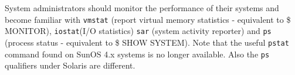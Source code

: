 System administrators should monitor the performance of their systems and
become familiar with {\tt vmstat} (report virtual memory statistics - 
equivalent to \$ MONITOR),  {\tt iostat}(I/O statistics)
{\tt sar} (system activity reporter) and {\tt ps}
(process status - equivalent to  \$ SHOW SYSTEM). Note that the useful
{\tt pstat} command found on SunOS 4.x systems is no longer available. 
Also the {\tt ps} qualifiers under Solaris are different. 


